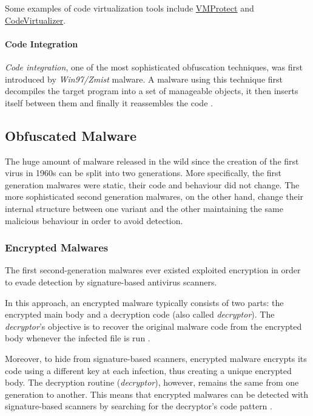 \documentclass[pdfa%
,cucitura%
]{toptesi}
\begin{document}
Some examples of code virtualization tools include \href{https://vmpsoft.com/}{VMProtect} and \href{https://www.oreans.com/CodeVirtualizer.php}{CodeVirtualizer}.

\paragraph{Code Integration}
\textit{Code integration}, one of the most sophisticated obfuscation techniques, was first introduced by \textit{Win97/Zmist} malware. A malware using this technique first decompiles the target program into a set of manageable objects, it then inserts itself between them and finally it reassembles the code \cite{YouMalwareOT}.

\subsection{Obfuscated Malware}
The huge amount of malware released in the wild since the creation of the first virus in 1960s can be split into two generations. More specifically, the first generation malwares were static, their code and behaviour did not change. The more sophisticated second generation malwares, on the other hand, change their internal structure between one variant and the other maintaining the same malicious behaviour in order to avoid detection.

\subsubsection{Encrypted Malwares}
The first second-generation malwares ever existed exploited encryption in order to evade detection by signature-based antivirus scanners.

In this approach, an encrypted malware typically consists of two parts: the encrypted main body and a decryption code (also called \textit{decryptor}). The \textit{decryptor}'s objective is to recover the original malware code from the encrypted body whenever the infected file is run \cite{YouMOT}.

Moreover, to hide from signature-based scanners, encrypted malware encrypts its code using a different key at each infection, thus creating a unique encrypted body. The decryption routine (\textit{decryptor}), however, remains the same from one generation to another. This means that encrypted malwares can be detected with signature-based scanners by searching for the decryptor's code pattern \cite{Sharma_2014}.
\end{document}
